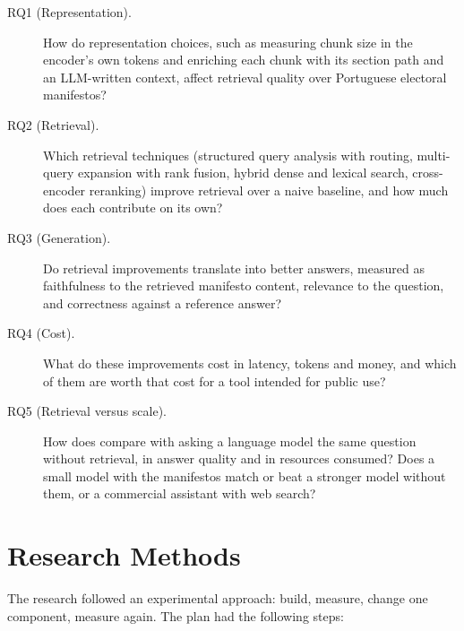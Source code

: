 \begin{description}
    \item[RQ1 (Representation).] How do representation choices, such as measuring
    chunk size in the encoder's own tokens and enriching each chunk with its
    section path and an LLM-written context, affect retrieval quality over
    Portuguese electoral manifestos?

    \item[RQ2 (Retrieval).] Which retrieval techniques (structured query
    analysis with routing, multi-query expansion with rank fusion, hybrid
    dense and lexical search, cross-encoder reranking) improve retrieval over
    a naive baseline, and how much does each contribute on its own?

    \item[RQ3 (Generation).] Do retrieval improvements translate into
    better answers, measured as faithfulness to the retrieved manifesto
    content, relevance to the question, and correctness against a reference
    answer?

    \item[RQ4 (Cost).] What do these improvements cost in latency, tokens
    and money, and which of them are worth that cost for a tool intended for
    public use?

    \item[RQ5 (Retrieval versus scale).] How does \sysname{} compare with
    asking a language model the same question without retrieval, in answer
    quality and in resources consumed? Does a small model with the manifestos
    match or beat a stronger model without them, or a commercial assistant
    with web search?
\end{description}

\section{Research Methods}

The research followed an experimental approach: build, measure, change one component, measure again. The plan had the following steps:

